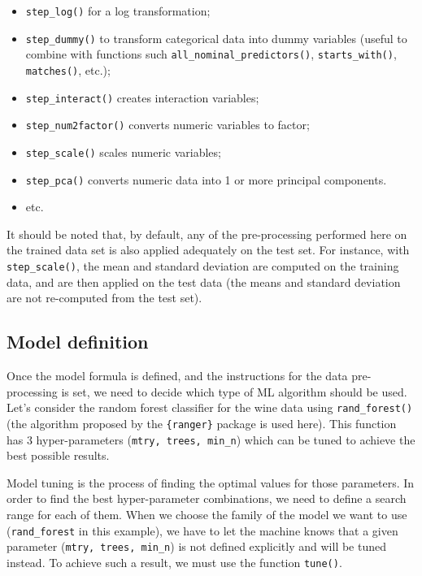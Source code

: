 \documentclass[
]{krantz}
\providecommand{\tightlist}{%
  \setlength{\itemsep}{0pt}\setlength{\parskip}{0pt}}
\renewenvironment{quote}{\begin{VF}}{\end{VF}}
\begin{document}
\begin{itemize}
\tightlist
\item
  \texttt{step\_log()} for a log transformation;
\item
  \texttt{step\_dummy()} to transform categorical data into dummy variables (useful to combine with functions such \texttt{all\_nominal\_predictors()}, \texttt{starts\_with()}, \texttt{matches()}, etc.);
\item
  \texttt{step\_interact()} creates interaction variables;
\item
  \texttt{step\_num2factor()} converts numeric variables to factor;
\item
  \texttt{step\_scale()} scales numeric variables;
\item
  \texttt{step\_pca()} converts numeric data into 1 or more principal components.
\item
  etc.
\end{itemize}

\begin{quote}
It should be noted that, by default, any of the pre-processing performed here on the trained data set is also applied adequately on the test set. For instance, with \texttt{step\_scale()}, the mean and standard deviation are computed on the training data, and are then applied on the test data (the means and standard deviation are not re-computed from the test set).
\end{quote}

\hypertarget{model-definition}{%
\subsection{Model definition}\label{model-definition}}

Once the model formula is defined, and the instructions for the data pre-processing is set, we need to decide which type of ML algorithm should be used. Let's consider the random forest classifier for the wine data using \texttt{rand\_forest()} (the algorithm proposed by the \texttt{\{ranger\}} package is used here). This function has 3 hyper-parameters (\texttt{mtry,\ trees,\ min\_n}) which can be tuned to achieve the best possible results.

Model tuning is the process of finding the optimal values for those parameters. In order to find the best hyper-parameter combinations, we need to define a search range for each of them. When we choose the family of the model we want to use (\texttt{rand\_forest} in this example), we have to let the machine knows that a given parameter (\texttt{mtry,\ trees,\ min\_n}) is not defined explicitly and will be tuned instead. To achieve such a result, we must use the function \texttt{tune()}.
\end{document}
